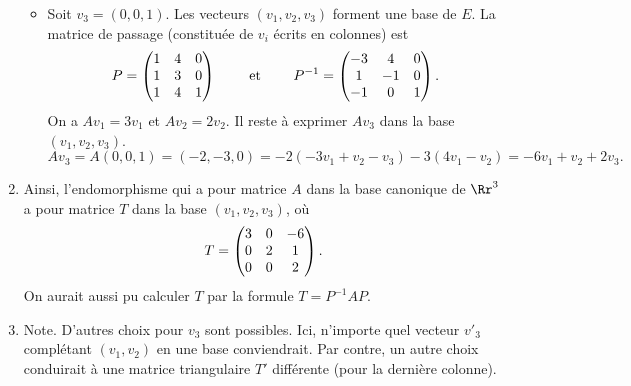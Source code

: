 \documentclass[12pt, class=report,crop=false]{standalone}
\begin{document}
\begin{exemple}
\begin{enumerate}
\begin{itemize}
    \item Soit $v_3=(0,0, 1)$. 
    Les vecteurs $(v_1, v_2, v_3)$ forment une base de $E$. 
    La matrice de passage (constituée de $v_i$ écrits en colonnes) est  
    $$P=\begin{pmatrix}1&4&0\cr 1&3&0\cr 1&4&1\end{pmatrix}\qquad  \text{ et } \qquad 
P^{-1}=\begin{pmatrix}-3&4&0\cr 1&-1&0\cr -1&0&1\end{pmatrix}.$$ 
On a $Av_1=3v_1$ et $Av_2=2v_2$. Il reste à exprimer $Av_3$ dans la base $(v_1, v_2, v_3)$.
$$Av_3 = A(0,0,1) = (-2,-3,0) = -2(-3v_1+v_2-v_3)-3(4v_1-v_2) = -6v_1+v_2+2v_3.$$


  \end{itemize}
  
  \item  Ainsi, l'endomorphisme qui a pour matrice $A$ dans la base canonique de $\Rr^3$ a pour matrice $T$ dans la base
$(v_1, v_2, v_3)$, où
$$T = \begin{pmatrix}3&0&-6\cr 0&2&1\cr 0&0&2\end{pmatrix}.$$
On aurait aussi pu calculer $T$ par la formule $T=P^{-1}AP$.

     \item Note. D'autres choix pour $v_3$ sont possibles. Ici, n'importe quel vecteur $v'_3$
     complétant $(v_1,v_2)$ en une base conviendrait. Par contre, un autre choix conduirait à une matrice triangulaire $T'$ différente (pour la dernière colonne).
\end{enumerate}
\end{exemple} 
\end{document}
